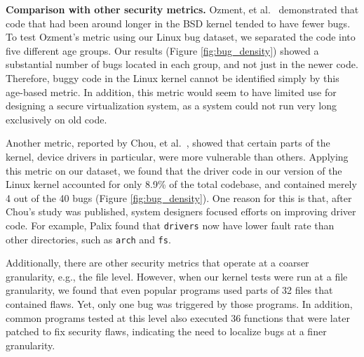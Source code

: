 {\bf Comparison with other security metrics.}
Ozment, et al.~\cite{ozment2006milk} demonstrated that code that
had been around longer in the BSD kernel tended to have fewer bugs.
To test Ozment's metric using our Linux bug dataset,
we separated the code into five different age groups. 
Our results (Figure \ref{fig:bug_density}) showed a substantial
number of bugs located in each group, and not just in the newer code.
Therefore, buggy code in the Linux kernel cannot be identified simply
by this age-based metric.
In addition, this metric would seem to have limited use for designing a secure
virtualization system, 
as a system could not run very long exclusively on old code.

Another metric, reported by Chou, et al.~\cite{PittSFIeld}, showed that certain parts of the kernel, 
device drivers in particular, were more vulnerable than others. 
Applying this metric on our dataset, we found that the driver code in our version
of the Linux kernel accounted for only 8.9\% of the total codebase, and contained
merely 4 out of the 40 bugs (Figure \ref{fig:bug_density}).
One reason for this is that, after Chou's study was published, system
designers focused efforts on improving driver code. For example, Palix \cite{palix2011faults}
found that %
\texttt{drivers} now have lower fault rate than other directories,
such as \texttt{arch} and \texttt{fs}.


Additionally, there are other security metrics that operate at a coarser granularity,
e.g., the file level. However, when our kernel tests were run at a file
granularity, we found that even popular programs used parts of %
32 files that contained flaws. Yet, only one bug was triggered by those programs.
In addition, common programs tested at this level also executed 36 functions
that were later patched to fix security
flaws, indicating the need to localize bugs at a finer granularity.

